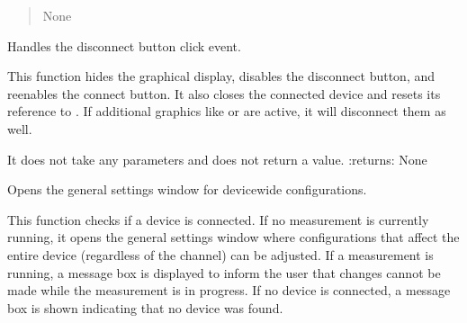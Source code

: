 \documentclass[letterpaper,10pt,english]{sphinxmanual}
\begin{document}
\begin{fulllineitems}
\begin{fulllineitems}
\begin{quote}
\begin{description}
\sphinxAtStartPar
None

\end{description}\end{quote}

\end{fulllineitems}


\begin{fulllineitems}
\label{\detokenize{main:main.MainWindow.disconnect_button_click}}
\pysigstartsignatures
{}
\pysigstopsignatures
\sphinxAtStartPar
Handles the disconnect button click event.

\sphinxAtStartPar
This function hides the graphical display, disables the disconnect button, and re\sphinxhyphen{}enables the connect button. 
It also closes the connected device and resets its reference to . 
If additional graphics like  or  are active, it will disconnect them as well.

\sphinxAtStartPar
It does not take any parameters and does not return a value.
:returns: None

\end{fulllineitems}


\begin{fulllineitems}
\label{\detokenize{main:main.MainWindow.general_settings_clicked}}
\pysigstartsignatures
{}
\pysigstopsignatures
\sphinxAtStartPar
Opens the general settings window for device\sphinxhyphen{}wide configurations.

\sphinxAtStartPar
This function checks if a device is connected. If no measurement is currently running, 
it opens the general settings window where configurations that affect the entire device 
(regardless of the channel) can be adjusted. If a measurement is running, a message box 
is displayed to inform the user that changes cannot be made while the measurement is in 
progress. If no device is connected, a message box is shown indicating that no device was found.


\end{fulllineitems}
\end{fulllineitems}
\end{document}
